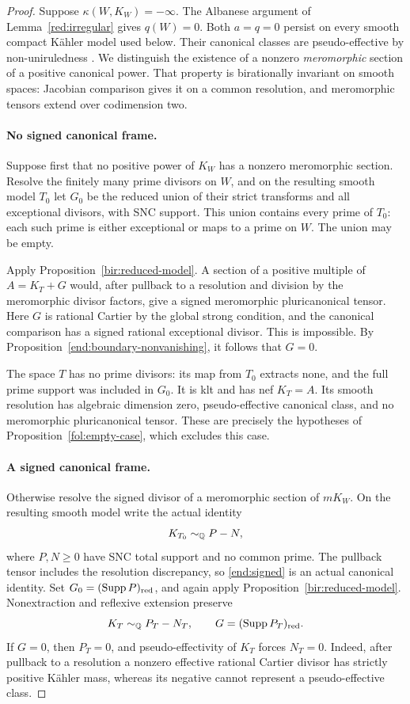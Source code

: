 \begin{proof}
Suppose \(\kappa(W,K_W)=-\infty\). The Albanese argument
of Lemma~\ref{red:irregular} gives \(q(W)=0\). Both
\(a=q=0\) persist on every smooth compact K\"ahler model used
below. Their canonical classes are pseudo-effective by
non-uniruledness \cite{OuUniruledness}. We distinguish the existence
of a nonzero \emph{meromorphic} section of a positive canonical
power. That property is birationally invariant on smooth spaces:
Jacobian comparison gives it on a common resolution, and
meromorphic tensors extend over codimension two.

\paragraph{No signed canonical frame.}
Suppose first that no positive power of \(K_W\) has a nonzero
meromorphic section. Resolve the finitely many prime divisors on
\(W\), and on the resulting smooth model \(T_0\) let \(G_0\)
be the reduced union of their strict transforms and all exceptional
divisors, with SNC support. This union contains every prime of
\(T_0\): each such prime is either exceptional or maps to a prime
on \(W\). The union may be empty.

Apply Proposition~\ref{bir:reduced-model}. A section of a positive
multiple of \(A=K_T+G\) would, after pullback to a resolution and
division by the meromorphic divisor factors, give a signed
meromorphic pluricanonical tensor. Here \(G\) is rational Cartier
by the global strong condition, and the canonical comparison has a
signed rational exceptional divisor. This is impossible. By
Proposition~\ref{end:boundary-nonvanishing}, it follows that
\(G=0\).

The space \(T\) has no prime divisors: its map from \(T_0\)
extracts none, and the full prime support was included in \(G_0\).
It is klt and has nef \(K_T=A\). Its smooth resolution has
algebraic dimension zero, pseudo-effective canonical class, and no
meromorphic pluricanonical tensor. These are precisely the
hypotheses of Proposition~\ref{fol:empty-case}, which excludes this case.

\paragraph{A signed canonical frame.}
Otherwise resolve the signed divisor of a meromorphic section of
\(mK_W\). On the resulting smooth model write the actual identity
\begin{equation}\label{end:signed}
 K_{T_0}\sim_{\mathbb{Q}}P-N,
\end{equation}
where \(P,N\ge0\) have SNC total support and no common prime.
The pullback tensor includes the resolution discrepancy, so
\eqref{end:signed} is an actual canonical identity. Set
\(G_0=(\operatorname{Supp} P)_{\mathrm{red}}\), and again apply
Proposition~\ref{bir:reduced-model}. Nonextraction and reflexive
extension preserve
\[
 K_T\sim_{\mathbb{Q}}P_T-N_T,
 \qquad G=(\operatorname{Supp} P_T)_{\mathrm{red}}.
\]
If \(G=0\), then \(P_T=0\), and pseudo-effectivity of \(K_T\)
forces \(N_T=0\). Indeed, after pullback to a resolution a
nonzero effective rational Cartier divisor has strictly positive
K\"ahler mass, whereas its negative cannot represent a
pseudo-effective class.


\end{proof}
